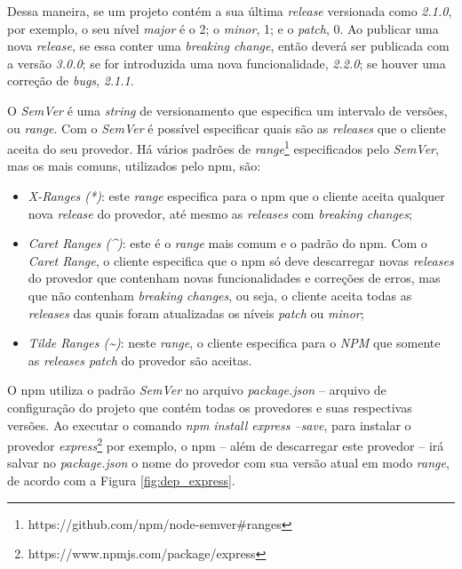 Dessa maneira, se um projeto contém a sua última \textit{release} versionada como \textit{2.1.0}, por exemplo, o seu nível \textit{major} é o 2; o \textit{minor}, 1; e o \textit{patch}, 0. Ao publicar uma nova \textit{release}, se essa conter uma \textit{breaking change}, então deverá ser publicada com a versão \textit{3.0.0}; se for introduzida uma nova funcionalidade, \textit{2.2.0}; se houver uma correção de \textit{bugs}, \textit{2.1.1}.

O \textit{SemVer} é uma \textit{string} de versionamento que especifica um intervalo de versões, ou \textit{range}. Com o \textit{SemVer} é possível especificar quais são as \textit{releases} que o cliente aceita do seu provedor. Há vários padrões de \textit{range}\footnote{https://github.com/npm/node-semver\#ranges} especificados pelo \textit{SemVer}, mas os mais comuns, utilizados pelo \gls{npm}, são:

\begin{itemize}
    \item \textit{X-Ranges (*)}: este \textit{range} especifica para o \gls{npm} que o cliente aceita qualquer nova \textit{release} do provedor, até mesmo as \textit{releases} com \textit{breaking changes};
    \item \textit{Caret Ranges (\textasciicircum)}: este é o \textit{range} mais comum e o padrão do \gls{npm}. Com o \textit{Caret Range}, o cliente especifica que o \gls{npm} só deve descarregar novas \textit{releases} do provedor que contenham novas funcionalidades e correções de erros, mas que não contenham \textit{breaking changes}, ou seja, o cliente aceita todas as \textit{releases} das quais foram atualizadas os níveis \textit{patch} ou \textit{minor};
    \item \textit{Tilde Ranges (\textasciitilde)}: neste \textit{range}, o cliente especifica para o \textit{NPM} que somente as \textit{releases patch} do provedor são aceitas.
\end{itemize}{}

O \gls{npm} utiliza o padrão \textit{SemVer} no arquivo \textit{package.json} -- arquivo de configuração do projeto que contém todas os provedores e suas respectivas versões. Ao executar o comando \textit{npm install express --save}, para instalar o provedor \textit{express}\footnote{https://www.npmjs.com/package/express} por exemplo, o \gls{npm} -- além de descarregar este provedor -- irá salvar no \textit{package.json} o nome do provedor com sua versão atual em modo \textit{range}, de acordo com a Figura \ref{fig:dep_express}.

